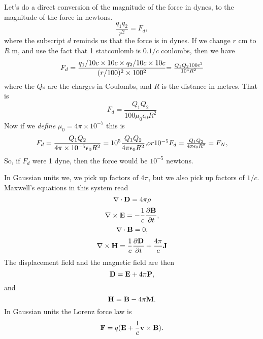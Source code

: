 \documentclass[12pt]{article}
\begin{document}
Let's do a direct conversion of the magnitude of the force in dynes, to the magnitude of the force in newtons.
\begin{equation}
\frac{q_1 q_2}{ r^2 }=F_d,
\end{equation}
where the subscript $d$ reminds us that the force is in dynes.
If we change $r$ cm to $R$ m, and use the fact that 1 statcoulomb
is $0.1/c$ coulombs, then we have
\begin{equation}
F_d= 
  \frac {  q_1/10 c \times 10 c \times q_2/10 c \times 10 c }
  {   (r / 100)^2 \times {100^2} }
$$   $$
  =\frac {  Q_1 Q_2 100 c^2 }
  { 10^4 R^2}
\end{equation}
where the $Q$s are the charges in Coulombs, and $R$ is the distance in metres.
That is 
\begin{equation}
F_d= 
  \frac {  Q_1 Q_2  }
  { 100 \mu_0 \epsilon_0 R^2 }
\end{equation}
 Now if we {\it define}
$\mu_0= 4 \pi \times 10^{-7}$ this is
\begin{equation}
F_d = \frac{ Q_1 Q_2}{ 4  \pi \times 10^{-5} \epsilon_0 R^2}
   = 10^{5} \frac{ Q_1 Q_2}{ 4  \pi \epsilon_0 R^2},
$$ or  $$ 
10^{-5} F_d  
   =  \frac{ Q_1 Q_2}{ 4  \pi \epsilon_0 R^2}=F_N,
\end{equation}
So, if $F_d$ were 1 dyne, then the force would be $10^{-5}$ newtons.




In Gaussian  units we, we pick up factors of $4 \pi$, but we also 
pick up factors of $1/c$. Maxwell's equations in this system  read
\begin{equation}
 \nabla \cdot {\bf D}= 4 \pi {\rho}
\end{equation}
\begin{equation}
\nabla \times {\bf E}=- \frac{1}{c} \frac{\partial {\bf B}}{\partial t},
\end{equation}
\begin{equation}
 \nabla \cdot {\bf B}=0,
\end{equation}
\begin{equation}
\nabla \times {\bf H}= 
\frac{1}{c} \frac{\partial {\bf D}}{\partial t} +
\frac{ 4 \pi}{c} {\bf J}
\end{equation}
The displacement field and the magnetic  field are then
\begin{equation}
{\bf D}={\bf E}+4 \pi {\bf P},
\end{equation}
and
\begin{equation}
{\bf H}={\bf B}-4 \pi {\bf M}.
\end{equation}
In Gaussian units the Lorenz force law is
\begin{equation}
{\bf F}=q ( {\bf E} + \frac{1}{c} {\bf v} \times {\bf B}).
\end{equation}
\end{document}
